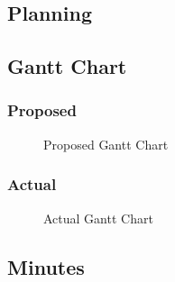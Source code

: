 \documentclass[a4paper]{article}
\begin{document}
\begin{landscape} %
\section{Planning}
\subsection{Gantt Chart}
\subsubsection{Proposed}
\begin{figure}[!ht] %
    \centering
    \caption{Proposed Gantt Chart}
    \label{fig:proposed_gantt}
\end{figure}

\clearpage
\subsubsection{Actual} %
\begin{figure}[!ht]
    \centering
    \caption{Actual Gantt Chart}
    \label{fig:actual_gantt}
\end{figure}
\end{landscape}

\subsection{Minutes} %
\end{document}

